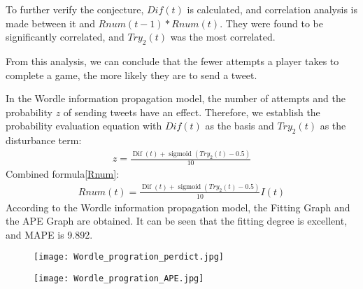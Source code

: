 \documentclass{mcmthesis}
\begin{document}
To further verify the conjecture, $Dif(t)$ is calculated, and correlation analysis is made between it and $Rnum(t-1)*Rnum(t)$. They were found to be significantly correlated, and $Try_2(t)$ was the most correlated.

From this analysis, we can conclude that the fewer attempts a player takes to complete a game, the more likely they are to send a tweet.

In the Wordle information propagation model, the number of attempts and the probability $z$ of sending tweets have an effect. Therefore, we establish the probability evaluation equation with $Dif(t)$ as the basis and $Try_2(t)$ as the disturbance term:
\begin{eqnarray}
	z  = \frac{\operatorname{Dif}(t)+\operatorname{sigmoid}\left(T r y_{2}(t)-0.5\right)}{10}
\end{eqnarray}
\qquad Combined formula\ref{Rnum}:
\begin{eqnarray}
	Rnum(t) = \frac{\operatorname{Dif}(t)+\operatorname{sigmoid}\left(T r y_{2}(t)-0.5\right)}{10}I(t)
\end{eqnarray}
\qquad According to the Wordle information propagation model, the Fitting Graph and the APE Graph are obtained. It can be seen that the fitting degree is excellent, and MAPE is 9.892.
\begin{figure}[H]
	\subfigure
	{
		\begin{minipage}[b]{.28\linewidth}
			\centering
			\texttt{[image: Wordle\_progration\_perdict.jpg]}
		\end{minipage}
	} \quad \quad \quad \quad \quad \quad \quad 
	\subfigure
	{
		\begin{minipage}[b]{.28\linewidth}
			\texttt{[image: Wordle\_progration\_APE.jpg]}
		\end{minipage}
	}
\end{figure}

%
\end{document}
